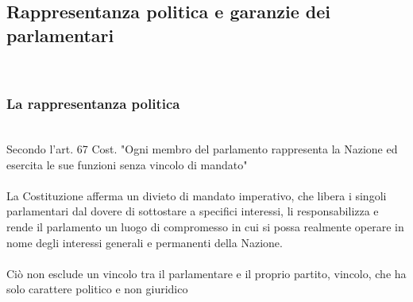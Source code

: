 \documentclass{report}
\begin{document}
\subsection{Rappresentanza politica e garanzie dei parlamentari}
\\
\subsubsection{La rappresentanza politica}
\\
Secondo l'art. 67 Cost. "Ogni membro del parlamento rappresenta la Nazione ed esercita le sue funzioni senza vincolo di mandato"
\\
\\
La Costituzione afferma un divieto di mandato imperativo, che libera i singoli parlamentari dal dovere di sottostare a specifici interessi, li responsabilizza e rende il parlamento un luogo di compromesso in cui si possa realmente operare in nome degli interessi generali e permanenti della Nazione.
\\
\\
Ciò non esclude un vincolo tra il parlamentare e il proprio partito, vincolo, che ha solo carattere politico e non giuridico
\\
\end{document}
